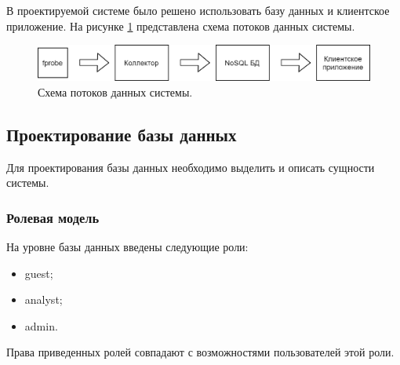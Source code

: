 В проектируемой системе было решено использовать базу данных и клиентское приложение. На рисунке \ref{fullSCH} представлена схема потоков данных системы.

\begin{figure}[H]
	\centering
	\includegraphics[scale=0.55]{conc.png}
	\caption{Схема потоков данных системы.}
	\label{fullSCH}
\end{figure}


\subsection{Проектирование базы данных}

Для проектирования базы данных необходимо выделить и описать сущности системы.
\subsubsection{Ролевая модель}
На уровне базы данных введены следующие роли:
\begin{itemize}
	\item[1)] guest;
	\item[2)] analyst;
	\item[3)] admin.
\end{itemize}
\indent \indent Права приведенных ролей совпадают с возможностями пользователей этой роли.

